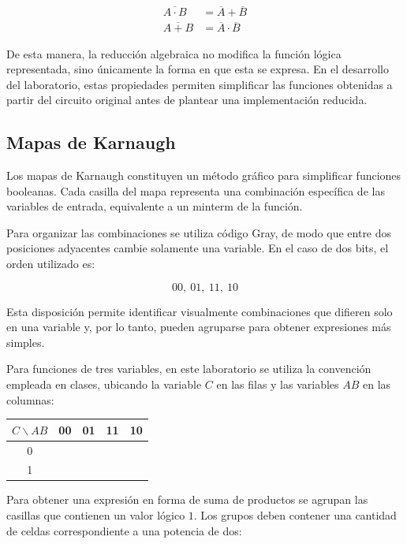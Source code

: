 \documentclass[12pt]{report}
\begin{document}
\begin{align}
    \overline{A \cdot B} &= \overline{A} + \overline{B} \\
    \overline{A + B} &= \overline{A} \cdot \overline{B}
\end{align}

De esta manera, la reducción algebraica no modifica la función lógica representada,
sino únicamente la forma en que esta se expresa. En el desarrollo del laboratorio,
estas propiedades permiten simplificar las funciones obtenidas a partir del circuito
original antes de plantear una implementación reducida.


\subsection{Mapas de Karnaugh}

Los mapas de Karnaugh constituyen un método gráfico para simplificar funciones booleanas. Cada casilla del mapa representa una combinación específica de las variables de entrada, equivalente a un minterm de la función.

Para organizar las combinaciones se utiliza código Gray, de modo que entre dos posiciones adyacentes cambie solamente una variable. En el caso de dos bits, el orden utilizado es:

\begin{equation}
    00,\ 01,\ 11,\ 10
\end{equation}

Esta disposición permite identificar visualmente combinaciones que difieren solo en una variable y, por lo tanto, pueden agruparse para obtener expresiones más simples.

Para funciones de tres variables, en este laboratorio se utiliza la convención empleada en clases, ubicando la variable $C$ en las filas y las variables $AB$ en las columnas:

\begin{center}
\begin{tabular}{c|cccc}
    $C\backslash AB$ & 00 & 01 & 11 & 10 \\
    \hline
    0 & & & & \\
    1 & & & &
\end{tabular}
\end{center}

Para obtener una expresión en forma de suma de productos se agrupan las casillas que contienen un valor lógico $1$. Los grupos deben contener una cantidad de celdas correspondiente a una potencia de dos:
\end{document}
